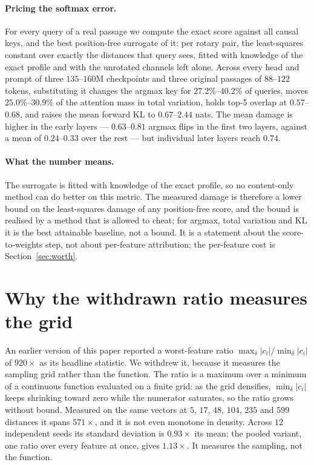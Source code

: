\documentclass{article}
\theoremstyle{plain}
\theoremstyle{remark}
\begin{document}
\paragraph{Pricing the softmax error.} For every query of a real passage we
compute the exact score against all causal keys, and the best position-free
surrogate of it: per rotary pair, the least-squares constant over exactly the
distances that query sees, fitted with knowledge of the exact profile and with
the unrotated channels left alone. Across every head and prompt of three
$135$--$160$M checkpoints and three original passages of $88$--$122$ tokens,
substituting it changes the argmax key for $27.2\%$--$40.2\%$ of queries, moves
$25.0\%$--$30.9\%$ of the attention mass in total variation, holds top-5 overlap
at $0.57$--$0.68$, and raises the mean forward KL to $0.67$--$2.44$ nats. The
mean damage is higher in the early layers --- $0.63$--$0.81$ argmax flips in the
first two layers, against a mean of $0.24$--$0.33$ over the rest --- but
individual later layers reach $0.74$.

\paragraph{What the number means.} The surrogate is fitted with knowledge of the
exact profile, so no content-only method can do better on this metric. The
measured damage is therefore a lower bound on the least-squares damage of any
position-free score, and the bound is realised by a method that is allowed to
cheat; for argmax, total variation and KL it is the best attainable baseline,
not a bound. It is a
statement about the score-to-weights step, not about per-feature attribution;
the per-feature cost is Section~\ref{sec:worth}.

\section{Why the withdrawn ratio measures the grid}
\label{app:ratio}

An earlier version of this paper reported a worst-feature ratio
$\max_\delta|c_i|/\min_\delta|c_i|$ of $920\times$ as its headline statistic. We
withdrew it, because it measures the sampling grid rather than the function. The
ratio is a maximum over a minimum of a continuous function evaluated on a finite
grid: as the grid densifies, $\min_\delta|c_i|$ keeps shrinking toward zero while
the numerator saturates, so the ratio grows without bound. Measured on the same
vectors at $5$, $17$, $48$, $104$, $235$ and $599$ distances it spans
$571\times$, and it is not even monotone in density. Across $12$ independent
seeds its standard deviation is $0.93\times$ its mean; the pooled variant, one
ratio over every feature at once, gives $1.13\times$. It measures the sampling,
not the function.
\end{document}
